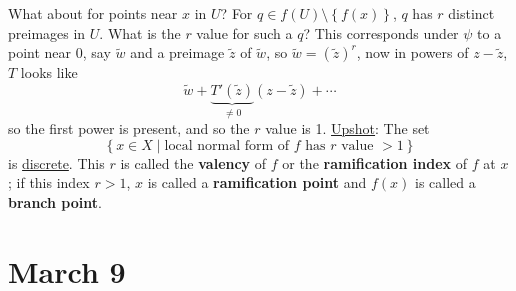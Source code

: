 \documentclass[12pt]{article}
\newcommand\setb[1]{\left \{ #1 \right \}}
\theoremstyle{definition}
\theoremstyle{remark}
\begin{document}
What about for points near $x$ in $U$? For $q \in f(U) \setminus \setb{ f(x) }$, $q$ has $r$ distinct preimages in $U$. What is the $r$ value for such a $q$? This corresponds under $\psi$ to a point near $0$, say $\tilde{w}$ and a preimage $\tilde{z}$ of $\tilde{w}$, so $\tilde{w} = \left( \tilde{z} \right)^r$, now in powers of $z - \tilde{z}$, $T$ looks like 
\begin{equation}
    \tilde{w} + \underbrace{ T'(\tilde{z}) }_{\neq 0}(z - \tilde{z}) + \dotsb
\end{equation}
so the first power is present, and so the $r$ value is 1.
\newline
\newline
\underline{Upshot}: The set
\begin{equation}
    \setb{x \in X \mid \text{local normal form of $f$ has $r$ value $>1$}}
\end{equation}
is \underline{discrete}. This $r$ is called the \textbf{valency} of $f$ or the \textbf{ramification index} of $f$ at $x$; if this index $r > 1$, $x$ is called a \textbf{ramification point} and $f(x)$ is called a \textbf{branch point}.
\section{March 9}
\end{document}
